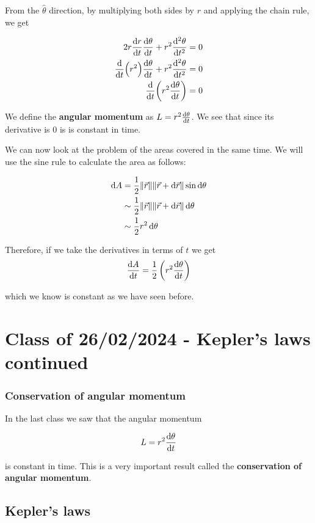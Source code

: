 \documentclass[10pt]{extarticle}
\begin{document}
From the $\hat \theta$ direction, by multiplying both sides by $r$ and applying the chain rule, we get

\begin{align*}
    2 r \dv{r}{t} \dv{\theta}{t} + r^2 \dv[2]{\theta}{t} & = 0 \\
    \dv{t}(r^2) \dv{\theta}{t} + r^2 \dv[2]{\theta}{t}   & = 0 \\
    \dv{t}(r^2 \dv{\theta}{t})                           & = 0
\end{align*}

We define the \textbf{angular momentum} as $L = r^2 \dv{\theta}{t}$.
We see that since its derivative is 0 is is constant in time.

We can now look at the problem of the areas covered in the same time.
We will use the sine rule to calculate the area as follows:

\begin{align*}
    \dd{A} & = \frac{1}{2} \norm{\vec r} \norm{\vec{r} + \dd{\vec{r}}} \sin \dd{\theta} \\
           & \sim \frac{1}{2} \norm{\vec r} \norm{\vec{r} + \dd{\vec{r}}} \dd{\theta}   \\
           & \sim \frac{1}{2} r^2 \dd{\theta}                                           \\
\end{align*}

Therefore, if we take the derivatives in terms of $t$ we get
$$
    \dv{A}{t} = \frac{1}{2} \left(r^2 \dv{\theta}{t}\right)
$$

which we know is constant as we have seen before.

\section{Class of 26/02/2024 - Kepler's laws continued}

\subsubsection{Conservation of angular momentum}

In the last class we saw that the angular momentum

$$
    L = r^2 \dv{\theta}{t}
$$

is constant in time. This is a very important result called the \textbf{conservation of angular momentum}.

\subsection{Kepler's laws}
\end{document}
